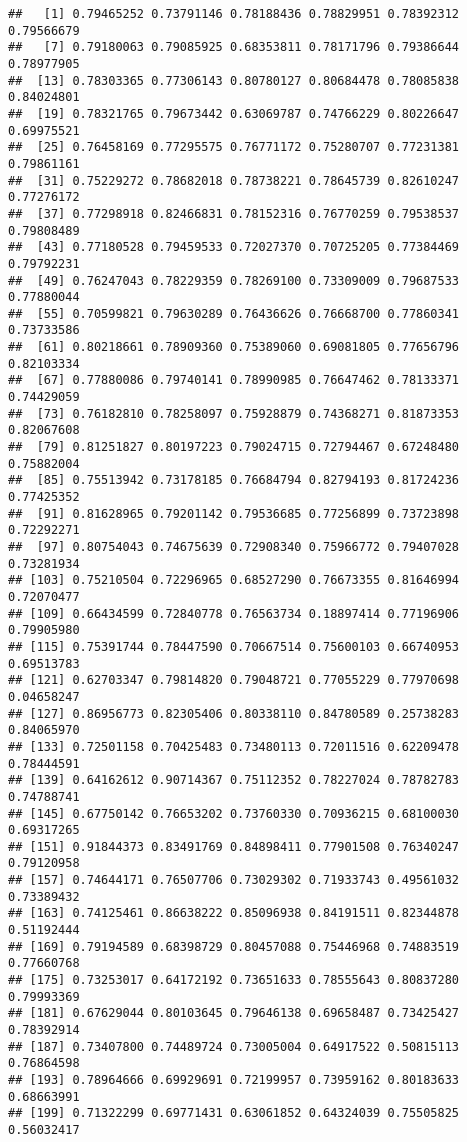 \documentclass[
]{article}
\begin{document}
\begin{verbatim}
##   [1] 0.79465252 0.73791146 0.78188436 0.78829951 0.78392312 0.79566679
##   [7] 0.79180063 0.79085925 0.68353811 0.78171796 0.79386644 0.78977905
##  [13] 0.78303365 0.77306143 0.80780127 0.80684478 0.78085838 0.84024801
##  [19] 0.78321765 0.79673442 0.63069787 0.74766229 0.80226647 0.69975521
##  [25] 0.76458169 0.77295575 0.76771172 0.75280707 0.77231381 0.79861161
##  [31] 0.75229272 0.78682018 0.78738221 0.78645739 0.82610247 0.77276172
##  [37] 0.77298918 0.82466831 0.78152316 0.76770259 0.79538537 0.79808489
##  [43] 0.77180528 0.79459533 0.72027370 0.70725205 0.77384469 0.79792231
##  [49] 0.76247043 0.78229359 0.78269100 0.73309009 0.79687533 0.77880044
##  [55] 0.70599821 0.79630289 0.76436626 0.76668700 0.77860341 0.73733586
##  [61] 0.80218661 0.78909360 0.75389060 0.69081805 0.77656796 0.82103334
##  [67] 0.77880086 0.79740141 0.78990985 0.76647462 0.78133371 0.74429059
##  [73] 0.76182810 0.78258097 0.75928879 0.74368271 0.81873353 0.82067608
##  [79] 0.81251827 0.80197223 0.79024715 0.72794467 0.67248480 0.75882004
##  [85] 0.75513942 0.73178185 0.76684794 0.82794193 0.81724236 0.77425352
##  [91] 0.81628965 0.79201142 0.79536685 0.77256899 0.73723898 0.72292271
##  [97] 0.80754043 0.74675639 0.72908340 0.75966772 0.79407028 0.73281934
## [103] 0.75210504 0.72296965 0.68527290 0.76673355 0.81646994 0.72070477
## [109] 0.66434599 0.72840778 0.76563734 0.18897414 0.77196906 0.79905980
## [115] 0.75391744 0.78447590 0.70667514 0.75600103 0.66740953 0.69513783
## [121] 0.62703347 0.79814820 0.79048721 0.77055229 0.77970698 0.04658247
## [127] 0.86956773 0.82305406 0.80338110 0.84780589 0.25738283 0.84065970
## [133] 0.72501158 0.70425483 0.73480113 0.72011516 0.62209478 0.78444591
## [139] 0.64162612 0.90714367 0.75112352 0.78227024 0.78782783 0.74788741
## [145] 0.67750142 0.76653202 0.73760330 0.70936215 0.68100030 0.69317265
## [151] 0.91844373 0.83491769 0.84898411 0.77901508 0.76340247 0.79120958
## [157] 0.74644171 0.76507706 0.73029302 0.71933743 0.49561032 0.73389432
## [163] 0.74125461 0.86638222 0.85096938 0.84191511 0.82344878 0.51192444
## [169] 0.79194589 0.68398729 0.80457088 0.75446968 0.74883519 0.77660768
## [175] 0.73253017 0.64172192 0.73651633 0.78555643 0.80837280 0.79993369
## [181] 0.67629044 0.80103645 0.79646138 0.69658487 0.73425427 0.78392914
## [187] 0.73407800 0.74489724 0.73005004 0.64917522 0.50815113 0.76864598
## [193] 0.78964666 0.69929691 0.72199957 0.73959162 0.80183633 0.68663991
## [199] 0.71322299 0.69771431 0.63061852 0.64324039 0.75505825 0.56032417

\end{verbatim}
\end{document}
